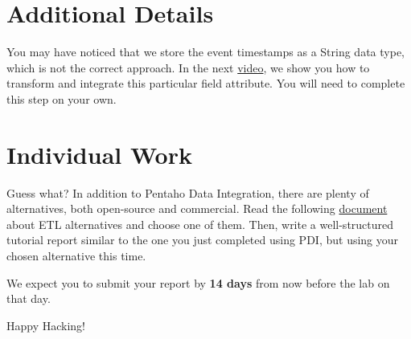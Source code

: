 \documentclass{article}
\begin{document}
\section{Additional Details}
You may have noticed that we store the event timestamps as a String data type, which is not the correct approach. In the next \href{https://youtu.be/wYve1mAfHp8}{video}, we show you how to transform and integrate this particular field attribute. You will need to complete this step on your own.

\section{Individual Work}
Guess what? In addition to Pentaho Data Integration, there are plenty of alternatives, both open-source and commercial. Read the following \href{https://drive.google.com/file/d/1rtwb_Rc7QxYul8SMOHqUgbfXHlMoksyD/view?usp=sharing}{document} about ETL alternatives and choose one of them. Then, write a well-structured tutorial report similar to the one you just completed using PDI, but using your chosen alternative this time.

We expect you to submit your report by \textbf{14 days} from now before the lab on that day.

\vspace{5mm}
Happy Hacking! 
\end{document}
